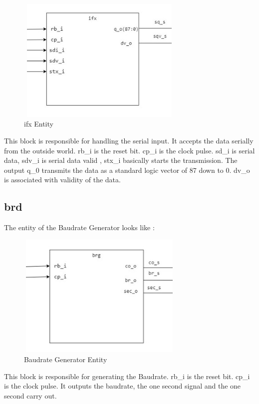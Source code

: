 \documentclass[12pt,a4paper]{article}
\begin{document}
\begin{figure}[H]
\centering
\includegraphics[width=8cm,height=6cm]{ifx_ss.jpg}
\caption{ifx Entity}
\label{ifx Entity}
\end{figure}

This block is responsible for handling the serial input. It accepts the data serially from the outside world. rb\_i is the reset bit. cp\_i is the clock pulse. sd\_i is serial data, sdv\_i is serial data valid , stx\_i basically starts the transmission. The output q\_0 transmits the data as a standard logic vector of 87 down to 0. dv\_o is associated with validity of the data. 

\subsection{brd}
The entity of the Baudrate Generator looks like :\\

\begin{figure}[H]
\centering
\includegraphics[width=8cm,height=6cm]{brg_ss.jpg}
\caption{Baudrate Generator Entity}
\label{Baudrate Generator Entity}
\end{figure}

This block is responsible for generating the Baudrate. rb\_i is the reset bit. cp\_i is the clock pulse. It outputs the baudrate, the one second signal and the one second carry out. 
\end{document}
